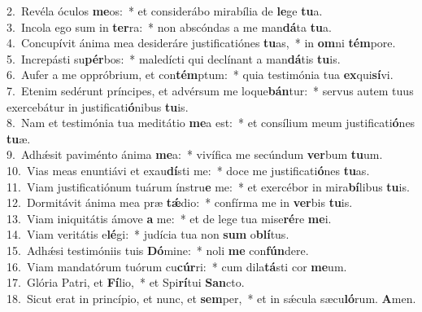 {2.~}Revéla óculos \textbf{me}os:~* et considerábo mirabília de \textbf{le}ge \textbf{tu}a.\\
{3.~}Incola ego sum in \textbf{ter}ra:~* non abscóndas a me man\textbf{dá}ta \textbf{tu}a.\\
{4.~}Concupívit ánima mea desideráre justificatiónes \textbf{tu}as,~* in \textbf{om}ni \textbf{tém}pore.\\
{5.~}Increpásti su\textbf{pér}bos:~* maledícti qui declínant a man\textbf{dá}tis \textbf{tu}is.\\
{6.~}Aufer a me oppróbrium, et con\textbf{tém}ptum:~* quia testimónia tua \textbf{ex}qui\textbf{sí}vi.\\
{7.~}Etenim sedérunt príncipes, et advérsum me loque\textbf{bán}tur:~* servus autem tuus exercebátur in justificati\textbf{ó}nibus \textbf{tu}is.\\
{8.~}Nam et testimónia tua meditátio \textbf{me}a est:~* et consílium meum justificati\textbf{ó}nes \textbf{tu}æ.\\
{9.~}Adhǽsit paviménto ánima \textbf{me}a:~* vivífica me secúndum \textbf{ver}bum \textbf{tu}um.\\
{10.~}Vias meas enuntiávi et exau\textbf{dí}sti me:~* doce me justificati\textbf{ó}nes \textbf{tu}as.\\
{11.~}Viam justificatiónum tuárum ínstru\textbf{e} me:~* et exercébor in mira\textbf{bí}libus \textbf{tu}is.\\
{12.~}Dormitávit ánima mea præ \textbf{tǽ}dio:~* confírma me in \textbf{ver}bis \textbf{tu}is.\\
{13.~}Viam iniquitátis ámove \textbf{a} me:~* et de lege tua mise\textbf{ré}re \textbf{me}i.\\
{14.~}Viam veritátis e\textbf{lé}gi:~* judícia tua non \textbf{sum} o\textbf{blí}tus.\\
{15.~}Adhǽsi testimóniis tuis \textbf{Dó}mine:~* noli \textbf{me} con\textbf{fún}dere.\\
{16.~}Viam mandatórum tuórum cu\textbf{cúr}ri:~* cum dila\textbf{tá}sti cor \textbf{me}um.\\
{17.~}Glória Patri, et \textbf{Fí}lio,~* et Spi\textbf{rí}tui \textbf{San}cto.\\
{18.~}Sicut erat in princípio, et nunc, et \textbf{sem}per,~* et in sǽcula sæcu\textbf{ló}rum. \textbf{A}men.\\
